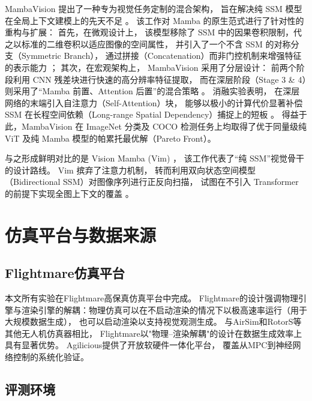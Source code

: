 MambaVision \cite{Hatamizadeh2025MambaVisionCVPR} 提出了一种专为视觉任务定制的混合架构，
旨在解决纯 SSM 模型在全局上下文建模上的先天不足 \cite{Zhu2024VisionMamba,Liu2024VMamba}。
该工作对 Mamba 的原生范式进行了针对性的重构与扩展：
首先，在微观设计上，
该模型移除了 SSM 中的因果卷积限制，代之以标准的二维卷积以适应图像的空间属性，
并引入了一个不含 SSM 的对称分支（Symmetric Branch），
通过拼接（Concatenation）而非门控机制来增强特征的表示能力 \cite{Hatamizadeh2025MambaVisionCVPR}；
其次，在宏观架构上，
MambaVision 采用了分层设计：
前两个阶段利用 CNN 残差块进行快速的高分辨率特征提取，
而在深层阶段（Stage 3 \& 4）则采用了“Mamba 前置、Attention 后置”的混合策略 \cite{Hatamizadeh2025MambaVisionCVPR}。
消融实验表明，
在深层网络的末端引入自注意力（Self-Attention）块，
能够以极小的计算代价显著补偿 SSM 在长程空间依赖（Long-range Spatial Dependency）捕捉上的短板 \cite{Hatamizadeh2025MambaVisionCVPR}。
得益于此，MambaVision 在 ImageNet 分类及 COCO 检测任务上均取得了优于同量级纯 ViT 及纯 Mamba 模型的帕累托最优解（Pareto Front）\cite{Hatamizadeh2025MambaVisionCVPR}。

与之形成鲜明对比的是 Vision Mamba (Vim) \cite{Zhu2024VisionMamba}，
该工作代表了“纯 SSM”视觉骨干的设计路线。
Vim 摈弃了注意力机制，
转而利用双向状态空间模型（Bidirectional SSM）对图像序列进行正反向扫描，
试图在不引入 Transformer 的前提下实现全图上下文的覆盖 \cite{Zhu2024VisionMamba}。

\section{仿真平台与数据来源}

\subsection{Flightmare仿真平台}

本文所有实验在Flightmare高保真仿真平台\cite{Song2021Flightmare}中完成。
Flightmare的设计强调物理引擎与渲染引擎的解耦：物理仿真可以在不启动渲染的情况下以极高速率运行（用于大规模数据生成），
也可以启动渲染以支持视觉观测生成。
与AirSim\cite{Shah2018AirSim}和RotorS\cite{Furrer2016RotorS}等其他无人机仿真器相比，
Flightmare以"物理--渲染解耦"的设计在数据生成效率上具有显著优势。
Agilicious\cite{Foehn2022Agilicious}提供了开放软硬件一体化平台，
覆盖从MPC到神经网络控制的系统化验证。

\subsection{评测环境}

